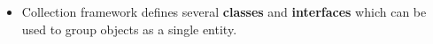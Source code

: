 \setlength{\columnsep}{3pt}
\begin{flushleft}
	
	
	\begin{itemize}
		\item Collection framework defines several \textbf{classes} and \textbf{interfaces} which can be used to group objects as a single entity.
		
		
		
		
	\end{itemize}
	
	
\end{flushleft}

\newpage

